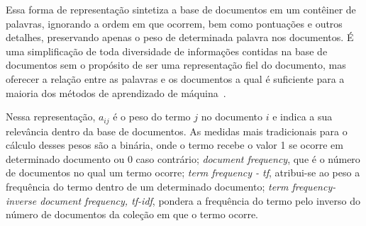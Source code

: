 Essa forma de representação sintetiza a base de documentos em um contêiner de palavras, ignorando a ordem em que ocorrem, bem como pontuações e outros detalhes, preservando apenas o peso de determinada palavra nos documentos. É uma simplificação de toda diversidade de informações contidas na base de documentos sem o propósito de ser uma representação fiel do documento, mas oferecer a relação entre as palavras e os documentos a qual é suficiente para a maioria dos métodos de aprendizado de máquina~\cite{Rezende2003}. 




Nessa representação, $a_{ij}$ é o peso do termo $j$ no documento $i$ e indica a sua relevância dentro da base de documentos. As medidas mais tradicionais para o cálculo desses pesos são a binária, onde o termo recebe o valor 1 se ocorre em determinado documento ou 0 caso contrário; \textit{document frequency}, que é o número de documentos no qual um termo ocorre; \textit{term frequency - tf}, atribui-se ao peso a frequência do termo dentro de um determinado documento; \textit{term frequency-inverse document frequency, tf-idf}, pondera a frequência do termo pelo inverso do número de documentos da coleção em que o termo ocorre.


